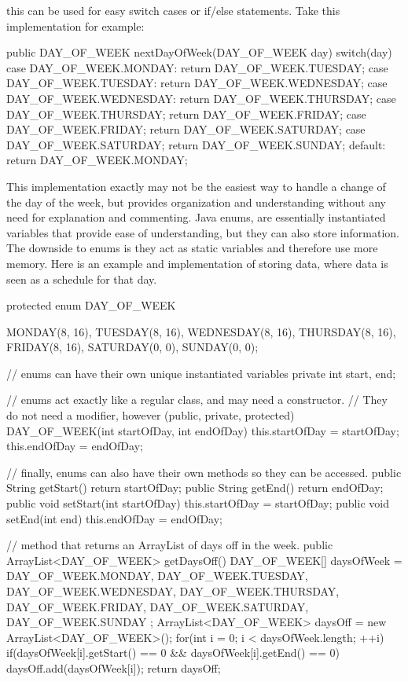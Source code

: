 \documentclass[11pt]{article}
\begin{document}
this can be used for easy switch cases or if/else statements. Take this implementation for example:

\begin{java}
public DAY_OF_WEEK nextDayOfWeek(DAY_OF_WEEK day)
{
	switch(day)
	{
	case DAY_OF_WEEK.MONDAY:
		return DAY_OF_WEEK.TUESDAY;
	case DAY_OF_WEEK.TUESDAY:
		return DAY_OF_WEEK.WEDNESDAY;
	case DAY_OF_WEEK.WEDNESDAY:
		return DAY_OF_WEEK.THURSDAY;
	case DAY_OF_WEEK.THURSDAY;
		return DAY_OF_WEEK.FRIDAY;
	case DAY_OF_WEEK.FRIDAY;
		return DAY_OF_WEEK.SATURDAY;
	case DAY_OF_WEEK.SATURDAY;
		return DAY_OF_WEEK.SUNDAY;
	default:
		return DAY_OF_WEEK.MONDAY;
	}
}
\end{java}

This implementation exactly may not be the easiest way to handle a change of the day of the week, but provides organization and understanding without any need for explanation and commenting. Java enums, are essentially instantiated variables that provide ease of understanding, but they can also store information. The downside to enums is they act as static variables and therefore use more memory. Here is an example and implementation of storing data, where data is seen as a schedule for that day.

\pagebreak
\begin{java}
protected enum DAY_OF_WEEK
{
	MONDAY(8, 16),
	TUESDAY(8, 16),
	WEDNESDAY(8, 16),
	THURSDAY(8, 16),
	FRIDAY(8, 16),
	SATURDAY(0, 0),
	SUNDAY(0, 0);

	// enums can have their own unique instantiated variables
	private int start, end;

	// enums act exactly like a regular class, and may need a constructor.
	// They do not need a modifier, however (public, private, protected)
	DAY_OF_WEEK(int startOfDay, int endOfDay)
	{
		this.startOfDay = startOfDay;
		this.endOfDay = endOfDay;
	}

	// finally, enums can also have their own methods so they can be accessed.
	public String getStart() { return startOfDay; }
	public String getEnd() { return endOfDay; }
	public void setStart(int startOfDay) { this.startOfDay = startOfDay; }
	public void setEnd(int end) { this.endOfDay = endOfDay; }
}

// method that returns an ArrayList of days off in the week.
public ArrayList<DAY_OF_WEEK> getDaysOff()
{
	DAY_OF_WEEK[] daysOfWeek =
		{
		 DAY_OF_WEEK.MONDAY,
		 DAY_OF_WEEK.TUESDAY,
		 DAY_OF_WEEK.WEDNESDAY,
		 DAY_OF_WEEK.THURSDAY,
		 DAY_OF_WEEK.FRIDAY,
		 DAY_OF_WEEK.SATURDAY,
		 DAY_OF_WEEK.SUNDAY
		};
	ArrayList<DAY_OF_WEEK> daysOff = new ArrayList<DAY_OF_WEEK>();
	for(int i = 0; i < daysOfWeek.length; ++i)
	{
		if(daysOfWeek[i].getStart() == 0 && daysOfWeek[i].getEnd() == 0)
			daysOff.add(daysOfWeek[i]);
	}
	return daysOff;
}
\end{java}
\pagebreak
\end{document}
